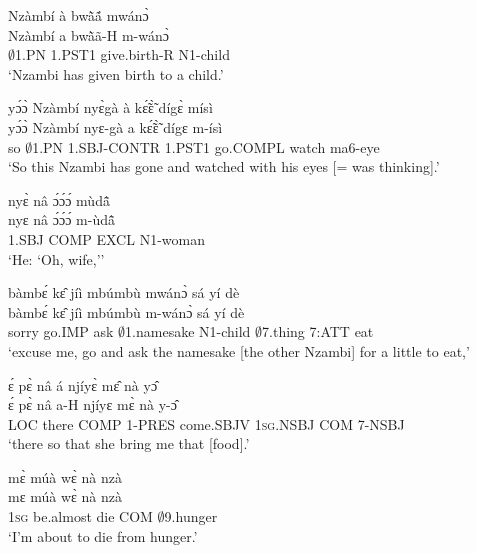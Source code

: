 \begin{exe} 
\exN\label{28}
  \glll  Nzàmbí à bwã̀ã́ mwánɔ̀ \\
          Nzàmbí a bwã̀ã-H m-wánɔ̀ \\
             $\emptyset$1.PN 1.PST1 give.birth-R N1-child \\
    \trans `Nzambi has given birth to a child.'
\end{exe}

\begin{exe} 
\exN\label{29}
  \glll  yɔ́ɔ̀ Nzàmbí nyɛ̀gà à kɛ̃́ɛ̃̀ dígɛ̀ mísì \\
         yɔ́ɔ̀ Nzàmbí nyɛ-gà a kɛ̃́ɛ̃̀ dígɛ m-ísì \\
           so $\emptyset$1.PN 1.SBJ-CONTR 1.PST1 go.COMPL watch ma6-eye  \\
    \trans `So this Nzambi has gone and watched with his eyes [= was thinking].'
\end{exe}

\begin{exe} 
\exN\label{30}
  \glll  nyɛ̀ nâ ɔ́ɔ́ɔ́ mùdã̂ \\
          nyɛ nâ ɔ́ɔ́ɔ́ m-ùdã̂ \\
            1.SBJ COMP EXCL N1-woman  \\
    \trans `He: `Oh, wife,''
\end{exe}

\begin{exe} 
\exN\label{31}
  \glll  bàmbɛ́ kɛ̂ jíì mbúmbù mwánɔ̀ sá yí dè  \\
        bàmbɛ́ kɛ̂ jíì mbúmbù m-wánɔ̀ sá yí dè \\
           sorry  go.IMP ask $\emptyset$1.namesake N1-child $\emptyset$7.thing 7:ATT eat  \\
    \trans `excuse me, go and ask the namesake [the other Nzambi] for a little to eat,'
\end{exe}

\begin{exe} 
\exN\label{32} 
  \glll   ɛ́ pɛ̀ nâ á njíyɛ̀ mɛ̂ nà yɔ̂ \\
         ɛ́ pɛ̀ nâ a-H njíyɛ mɛ̀ nà y-ɔ̂ \\
         LOC there COMP 1-PRES come.SBJV 1\textsc{sg}.NSBJ COM 7-NSBJ  \\
    \trans `there so that she bring me that [food].'
\end{exe}

\begin{exe} 
\exN\label{33}
  \glll  mɛ̀ múà wɛ̀ nà nzà \\
        mɛ múà wɛ̀ nà nzà \\
          1\textsc{sg} be.almost die COM $\emptyset$9.hunger  \\
    \trans `I'm about to die from hunger.'
\end{exe}


